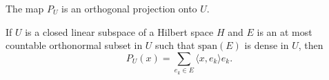 \documentclass[a4paper]{article}
\newcommand{\<}{\langle}
\renewcommand{\>}{\rangle}
\renewcommand{\span}{\mathrm{span}}
\begin{document}
\begin{prop}
  The map $P_U$ is an orthogonal projection onto $U$.
\end{prop}

\begin{prop}
  If $U$ is a closed linear subspace of a Hilbert space $H$ and $E$ is an at most countable orthonormal subset in $U$ such that $\span(E)$ is dense in $U$, then
  $$P_U(x) = \sum_{e_k\in E}\<x,e_k\>e_k.$$
\end{prop}
\end{document}
